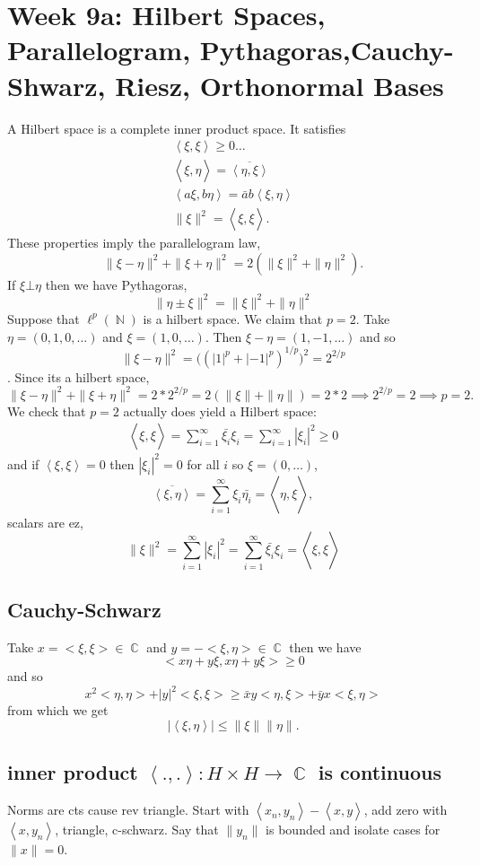 \documentclass{article}
\DeclareMathOperator\N{\mathbb{N}}
\DeclareMathOperator\C{\mathbb{C}}
\DeclareMathOperator\la{\langle}
\DeclareMathOperator\ra{\rangle}
\begin{document}
\section*{Week 9a: Hilbert Spaces, Parallelogram, Pythagoras,Cauchy-Shwarz, Riesz, Orthonormal Bases}
A Hilbert space is a complete inner product space. It satisfies
\begin{gather*}
\la \xi , \xi \ra \geq 0 \hdots \\
\la \xi, \eta \ra = \overline{\la \eta , \xi \ra} \\
\la a \xi, b \eta \ra = \bar{a} b \la \xi, \eta \ra \\
\| \xi \|^2 = \la \xi, \xi \ra.
\end{gather*}
These properties imply the parallelogram law, $$
\|\xi - \eta \|^2+ \|\xi + \eta \|^2 = 2 ( \| \xi \|^2 +\|\eta\|^2 ).
$$
If $\xi \bot \eta$ then we have Pythagoras, $$
\| \eta \pm \xi \|^2 = \|\xi\|^2+\|\eta\|^2
$$
Suppose that $\ell^p(\N)$ is a hilbert space. We claim that $p=2$. Take $\eta = (0,1,0, \hdots)$ and $\xi = (1, 0, \hdots)$.
Then $\xi - \eta = (1,-1, \hdots)$ and so
$$\|\xi - \eta \|^2 = \big((|1|^p+|-1|^p)^{1 \slash p} \big)^2
= 2^{2 \slash p}$$. Since its a hilbert space,
$$
\|\xi - \eta \|^2 + \| \xi + \eta \|^2 = 2*2^{2 \slash p} = 2(\|\xi\| + \|\eta \|) = 2*2 \implies 2^{2 \slash p} = 2 \implies p =2.
$$
We check that $p=2$ actually does yield a Hilbert space:
\begin{gather*}
\la \xi, \xi \ra = \sum_{i=1}^{\infty} \bar{\xi_i} \xi_i = \sum_{i=1}^{\infty} |\xi_i|^2 \geq 0
\end{gather*}
and if $\la \xi, \xi \ra = 0$ then $|\xi_i|^2 = 0$ for all $i$ so $\xi = (0,\hdots)$, $$
\overline{\la \xi, \eta \ra} = \sum_{i=1}^{\infty} \xi_i \bar{\eta_i} = \la \eta, \xi \ra,
$$
scalars are ez,
$$
\| \xi \|^2 = \sum_{i=1}^{\infty} |\xi_i|^2 =  \sum_{i=1}^{\infty} \bar{\xi_i} \xi_i = \la \xi , \xi \ra
$$
\subsection*{Cauchy-Schwarz}
Take $x = < \xi,\xi > \in \C$ and $y = -< \xi,\eta > \in \C$ then we have $$
< x \eta +y \xi, x \eta + y \xi > \geq 0
$$
and so $$
x^2 < \eta, \eta >  + |y|^2 < \xi, \xi > \geq \bar{x} y < \eta, \xi > + \bar{y}x < \xi, \eta >
$$
from which we get
$$
|\la \xi, \eta \ra| \leq \| \xi \| \|\eta\|.
$$
\subsection*{inner product $\la .,.\ra: H \times H \to \C$ is continuous}
Norms are cts cause rev triangle. Start with $\la x_n, y_n \ra - \la x, y \ra$, add zero with $\la x, y_n \ra$, triangle, c-schwarz. Say that $\|y_n\|$ is bounded and isolate cases for $\|x\| = 0$.
\end{document}
